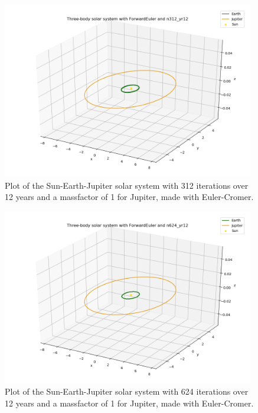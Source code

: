 \documentclass{article}
\begin{document}
    \begin{figure}[H]
        \centering
        \includegraphics[width = 11cm]{img/plot3D_S_E_J_F_n312_yr12.png}
        \caption{Plot of the Sun-Earth-Jupiter solar system with 312 iterations over 12 years and a massfactor of 1 for Jupiter, made with Euler-Cromer.}
        \label{fig:plot3D_S_E_J_F_n312_yr12}
    \end{figure}

    \begin{figure}[H]
        \centering
        \includegraphics[width = 11cm]{img/plot3D_S_E_J_F_n624_yr12.png}
        \caption{Plot of the Sun-Earth-Jupiter solar system with 624 iterations over 12 years and a massfactor of 1 for Jupiter, made with Euler-Cromer.}
        \label{fig:plot3D_S_E_J_F_624_yr12}
    \end{figure}
\end{document}
